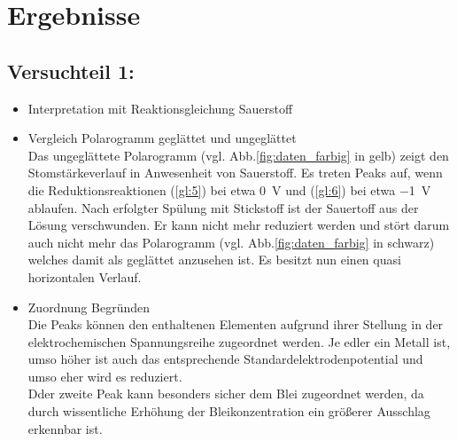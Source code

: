 \section{Ergebnisse}
\label{sec:ergebnisse}
\subsection{Versuchteil 1:}
 
 \begin{itemize}
 	\item Interpretation mit Reaktionsgleichung Sauerstoff\\
 		\begin{flalign}\label{gl:5}
 		\end{flalign}
 		\begin{flalign}\label{gl:6}
 		\end{flalign}
 	\item Vergleich Polarogramm geglättet und ungeglättet\\
 	Das ungeglättete Polarogramm (vgl. Abb.\ref{fig:daten_farbig} in gelb) zeigt den Stomstärkeverlauf in Anwesenheit von Sauerstoff. Es treten Peaks auf, wenn die Reduktionsreaktionen (\ref{gl:5}) bei etwa \SI{0}{\volt} und (\ref{gl:6}) bei etwa \SI{-1}{\volt} ablaufen. Nach erfolgter Spülung mit Stickstoff ist der Sauertoff aus der Lösung verschwunden. Er kann nicht mehr reduziert werden und stört darum auch nicht mehr das Polarogramm (vgl. Abb.\ref{fig:daten_farbig} in schwarz) welches damit als geglättet anzusehen ist. Es besitzt nun einen quasi horizontalen Verlauf.
 	
 	\item Zuordnung Begründen\\
 Die Peaks können den enthaltenen Elementen aufgrund ihrer Stellung in der elektrochemischen Spannungsreihe zugeordnet werden. Je edler ein Metall ist, umso höher ist auch das entsprechende Standardelektrodenpotential und umso eher wird es reduziert. \\
 Dder zweite Peak kann besonders sicher dem Blei zugeordnet werden, da durch wissentliche Erhöhung der Bleikonzentration ein größerer Ausschlag erkennbar ist.
 \end{itemize}
 
